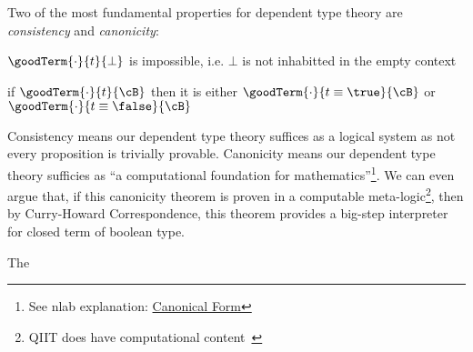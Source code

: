 Two of the most fundamental properties for dependent type theory are \textit{consistency} and \textit{canonicity}:
\begin{theorem}[Consistency]
  $\goodTerm{\cdot}{t}{\bot}$ is impossible, i.e. $\bot$ is not inhabitted in the empty context
\end{theorem}
\begin{theorem}[Canonicity]
  if $\goodTerm{\cdot}{t}{\cB}$ then it is either $\goodTerm{\cdot}{t \equiv \true}{\cB}$ or $\goodTerm{\cdot}{t \equiv \false}{\cB}$
\end{theorem}
Consistency means our dependent type theory suffices as a logical system as not every proposition is trivially provable. Canonicity means our dependent type theory sufficies as ``a computational foundation for mathematics''\footnote{See nlab explanation: \href{https://ncatlab.org/nlab/show/canonical+form}{Canonical Form}}. We can even argue that, if this canonicity theorem is proven in a computable meta-logic\footnote{QIIT does have computational content~\cite{altkap2016}}, 
then by Curry-Howard Correspondence, this theorem provides a big-step interpreter for closed term of boolean type. 

The 